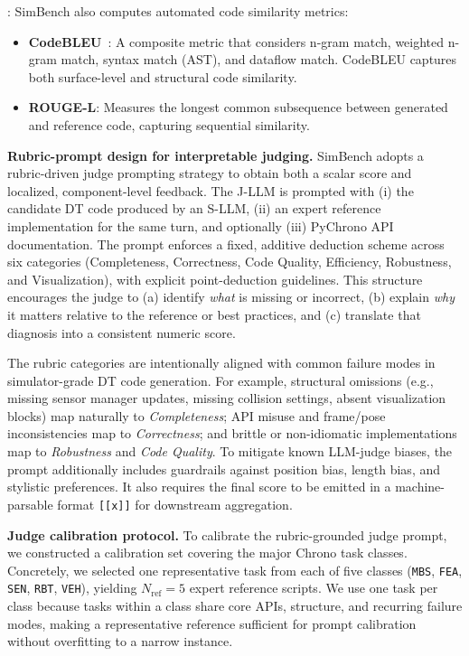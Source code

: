 \medskip

{}: SimBench also computes automated code similarity metrics:

\begin{itemize}
    \item \textbf{CodeBLEU}~\cite{ren2020codebleu}: A composite metric that considers n-gram match, weighted n-gram match, syntax match (AST), and dataflow match. CodeBLEU captures both surface-level and structural code similarity.
    \item \textbf{ROUGE-L}: Measures the longest common subsequence between generated and reference code, capturing sequential similarity.
\end{itemize}

\medskip
\noindent\textbf{Rubric-prompt design for interpretable judging.}
SimBench adopts a rubric-driven judge prompting strategy to obtain both a scalar score and localized, component-level feedback.
The J-LLM is prompted with (i) the candidate DT code produced by an S-LLM, (ii) an expert reference implementation for the same turn, and optionally (iii) PyChrono API documentation.
The prompt enforces a fixed, additive deduction scheme across six categories (Completeness, Correctness, Code Quality, Efficiency, Robustness, and Visualization), with explicit point-deduction guidelines.
This structure encourages the judge to (a) identify \emph{what} is missing or incorrect, (b) explain \emph{why} it matters relative to the reference or best practices, and (c) translate that diagnosis into a consistent numeric score.

\vspace{2pt}
\noindent
The rubric categories are intentionally aligned with common failure modes in simulator-grade DT code generation.
For example, structural omissions (e.g., missing sensor manager updates, missing collision settings, absent visualization blocks) map naturally to \emph{Completeness}; API misuse and frame/pose inconsistencies map to \emph{Correctness}; and brittle or non-idiomatic implementations map to \emph{Robustness} and \emph{Code Quality}.
To mitigate known LLM-judge biases, the prompt additionally includes guardrails against position bias, length bias, and stylistic preferences. It also requires the final score to be emitted in a machine-parsable format \texttt{[[x]]} for downstream aggregation.

\vspace{2pt}
\noindent\textbf{Judge calibration protocol.}
To calibrate the rubric-grounded judge prompt, we constructed a calibration set covering the major Chrono task classes. Concretely, we selected one representative task from each of five classes (\texttt{MBS}, \texttt{FEA}, \texttt{SEN}, \texttt{RBT}, \texttt{VEH}), yielding $N_{\text{ref}}=5$ expert reference scripts. We use one task per class because tasks within a class share core APIs, structure, and recurring failure modes, making a representative reference sufficient for prompt calibration without overfitting to a narrow instance.

